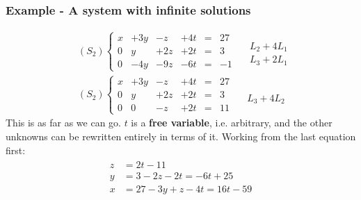 \documentclass[usenames,dvipsnames,aspectratio=169,10pt]{beamer}
\numberwithin{equation}{section}
\begin{document}
\begin{frame}
\frametitle{Example - A system with infinite solutions}
\begin{align*}
&
(S_2)
\left\{
\begin{matrix}
    x &  +3y &   -z &  +4t &=&   27 \\
    0 &    y &  +2z &  +2t &=&    3 \\
    0 &  -4y &  -9z &  -6t &=&   -1
\end{matrix}
\right.
\quad
\begin{array}{l}
   \\
 L_2 + 4L_1 \\
 L_3 + 2L_1
\end{array}
\\
&
(S_2)
\left\{
\begin{matrix}
    x &  +3y &   -z &  +4t &=&   27 \\
    0 &    y &  +2z &  +2t &=&    3 \\
    0 &    0 &   -z &  +2t &=&   11
\end{matrix}
\right.
\quad
\begin{array}{l}
   \\
   \\
 L_3 + 4L_2
\end{array}
\end{align*}
This is as far as we can go. $t$ is a \textbf{free variable}, i.e. arbitrary, and the other unknowns can be rewritten entirely in terms of it. Working from the last equation first:
\begin{align*}
\begin{array}{ll}
   z &=  2t -11\\
   y &=  3 -2z - 2t = -6t + 25\\
   x &= 27 - 3y + z - 4t = 16t - 59
\end{array}
\end{align*}
\end{frame}
\end{document}
